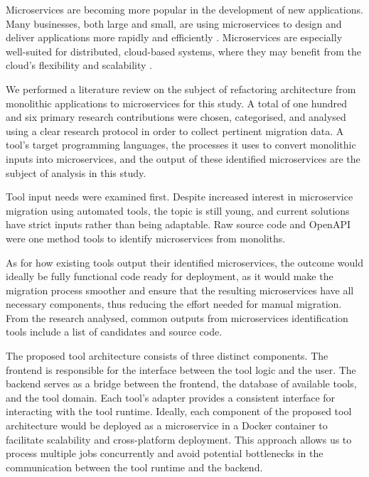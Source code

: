 Microservices are becoming more popular in the development of new applications.
Many businesses, both large and small, are using microservices to design and
deliver applications more rapidly and efficiently
\cite{richardson-microservices}. Microservices are especially well-suited for
distributed, cloud-based systems, where they may benefit from the cloud's
flexibility and scalability \cite{fowler-microservices-prerequisites}.

We performed a literature review on the subject of refactoring architecture
from monolithic applications to microservices for this study. A total of one
hundred and six primary research contributions were chosen, categorised, and
analysed using a clear research protocol in order to collect pertinent
migration data. A tool's target programming languages, the processes it uses to
convert monolithic inputs into microservices, and the output of these
identified microservices are the subject of analysis in this study.

Tool input needs were examined first. Despite increased interest in
microservice migration using automated tools, the topic is still young, and
current solutions have strict inputs rather than being adaptable. Raw source
code and OpenAPI were one method tools to identify microservices from
monoliths.

As for how existing tools output their identified microservices, the outcome
would ideally be fully functional code ready for deployment, as it would make
the migration process smoother and ensure that the resulting microservices have
all necessary components, thus reducing the effort needed for manual migration.
From the research analysed, common outputs from microservices identification
tools include a list of candidates and source code.

The proposed tool architecture consists of three distinct components. The
frontend is responsible for the interface between the tool logic and the user.
The backend serves as a bridge between the frontend, the database of available
tools, and the tool domain. Each tool's adapter provides a consistent interface
for interacting with the tool runtime. Ideally, each component of the proposed
tool architecture would be deployed as a microservice in a Docker container to
facilitate scalability and cross-platform deployment. This approach allows us
to process multiple jobs concurrently and avoid potential bottlenecks in the
communication between the tool runtime and the backend.

